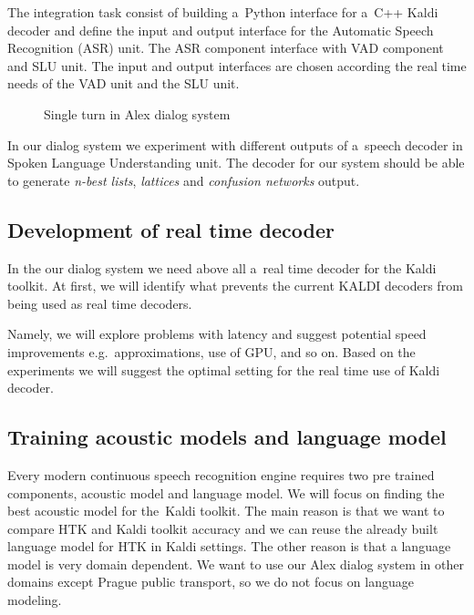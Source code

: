 The integration task consist of building a~Python interface for a~C++ Kaldi decoder and define the input and output interface for the Automatic Speech Recognition (ASR) unit. The ASR component interface with VAD component and SLU unit. The input and output interfaces are chosen according the real time needs of the VAD unit and the SLU unit.

\begin{figure}
    \begin{center}
    
    \caption{Single turn in Alex dialog system}
    \label{fig:dialog_system} 
    \end{center}
\end{figure}

In our dialog system we experiment with different outputs of a~speech decoder in Spoken Language Understanding unit. 
The decoder for our system should be able to generate {\it n-best lists}, {\it lattices} and {\it confusion networks} output.




\subsection{Development of real time decoder}
\label{sub:kaldi_rt_decoder}
In the our dialog system we need above all a~real time decoder for the Kaldi toolkit. At first, we will identify what prevents the current KALDI decoders from being used as real time decoders. 

Namely, we will explore problems with latency and suggest potential speed improvements e.g.\ approximations, use of GPU, and so on. Based on the experiments we will suggest the optimal setting for the real time use of Kaldi decoder.


\subsection{Training acoustic models and language model} 
\label{sub:training_kaldi_acoustic_models}
Every modern continuous speech recognition engine requires two pre trained components, acoustic model and language model.
We will focus on finding the best acoustic model for the~Kaldi toolkit. The main reason is that we want to compare HTK and Kaldi toolkit accuracy and we can reuse the already built language model for HTK in Kaldi settings.
The other reason is that a language model is very domain dependent. We want to use our Alex dialog system in other domains except Prague public transport, so we do not focus on language modeling. 

